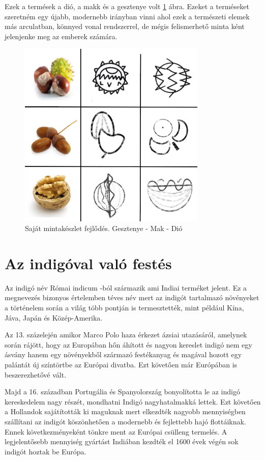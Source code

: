 \documentclass[fontsize=12pt, appendixprefix=true]{scrreprt}
\begin{document}
Ezek a termések a dió, a makk és a gesztenye volt \ref{fig:sajat1} ábra.
Ezeket a terméseket szeretném egy újabb, modernebb irányban vinni ahol ezek a természeti elemek más arculatban, könnyed vonal rendszerrel, de mégis felismerhető minta ként jelenjenke meg az emberek számára.

\begin{figure}[h!]
	\centering
	\includegraphics[width=0.8\textwidth]{img/sajat01.jpg}
	\caption{Saját mintakészlet fejlődés. Gesztenye - Mak - Dió}
	\label{fig:sajat1}
\end{figure}

\chapter{Az indigóval való festés}
Az indigó név Római indicum -ból származik ami Indiai terméket jelent.
Ez a megnevezés bizonyos értelemben téves név mert az indigót tartalmazó növényeket a történelem során a világ több pontján is termesztették, mint például Kína, Jáva, Japán és Közép-Amerika.  

Az 13. százelején amikor Marco Polo haza érkezet ázsiai utazásáról, amelynek során rájött, hogy az Europában hőn áhított és nagyon kereslet indigó nem egy ásvány hanem egy növényekből származó festékanyag és magával hozott egy palántát új színtörtbe az Európai divatba. Ezt követően már Európában is beszerezhetővé vált.

Majd a 16. században Portugália és Spanyolország bonyolította le az indigó kereskedelem nagy részét, mondhatni Indigó nagyhatalmakká lettek.
Ezt követően a Hollandok sajátították ki maguknak mert elkezdték nagyobb mennyiségben szállítani az indigót köszönhetően a modernebb és fejlettebb hajó flottáiknak. Ennek következményeként tönkre ment az Európai csülleng termelés. A legjelentősebb mennyiség gyártást Indiában kezdték el 1600 évek végén sok indigót hoztak be Európa.
 
\end{document}
